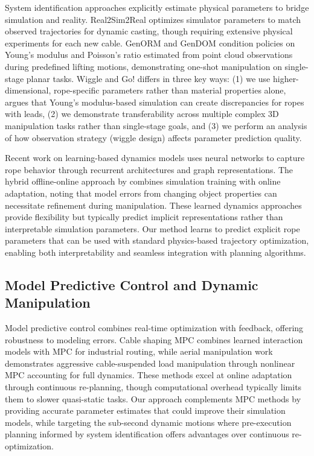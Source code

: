 \documentclass[conference]{IEEEtran}
\newcommand{\waglong}{Wiggle and Go!}
\begin{document}
System identification approaches explicitly estimate physical parameters to bridge simulation and reality. Real2Sim2Real \cite{lim_planar_2022} optimizes simulator parameters to match observed trajectories for dynamic casting, though requiring extensive physical experiments for each new cable. GenORM \cite{kuroki_genorm_2025} and GenDOM \cite{kuroki_gendom_2025} condition policies on Young's modulus and Poisson's ratio estimated from point cloud observations during predefined lifting motions, demonstrating one-shot manipulation on single-stage planar tasks. \waglong{} differs in three key ways: (1) we use higher-dimensional, rope-specific parameters rather than material properties alone, \citet{lim_planar_2022} argues that Young's modulus-based simulation can create discrepancies for ropes with leads, (2) we demonstrate transferability across multiple complex 3D manipulation tasks rather than single-stage goals, and (3) we perform an analysis of how observation strategy (wiggle design) affects parameter prediction quality.

Recent work on learning-based dynamics models \cite{yang2022learning, wang2022offline} uses neural networks to capture rope behavior through recurrent architectures and graph representations. The hybrid offline-online approach by \citet{yu_shape_2022} combines simulation training with online adaptation, noting that model errors from changing object properties can necessitate refinement during manipulation. These learned dynamics approaches provide flexibility but typically predict implicit representations rather than interpretable simulation parameters. Our method learns to predict explicit rope parameters that can be used with standard physics-based trajectory optimization, enabling both interpretability and seamless integration with planning algorithms.

\subsection{Model Predictive Control and Dynamic Manipulation}

Model predictive control combines real-time optimization with feedback, offering robustness to modeling errors. Cable shaping MPC \cite{viljoen2024cable} combines learned interaction models with MPC for industrial routing, while aerial manipulation work \cite{sun2023nonlinear, sun2025agile} demonstrates aggressive cable-suspended load manipulation through nonlinear MPC accounting for full dynamics. These methods excel at online adaptation through continuous re-planning, though computational overhead typically limits them to slower quasi-static tasks. Our approach complements MPC methods by providing accurate parameter estimates that could improve their simulation models, while targeting the sub-second dynamic motions where pre-execution planning informed by system identification offers advantages over continuous re-optimization.
\end{document}
